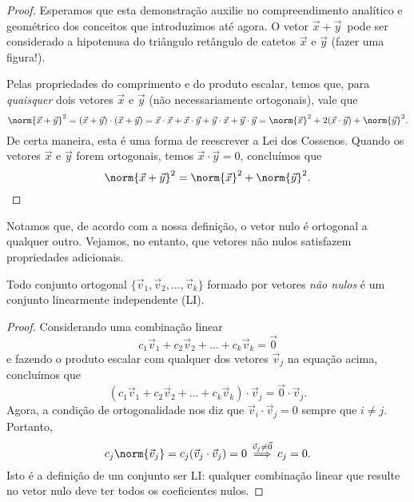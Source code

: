 \begin{proof}
	Esperamos que esta demonstração auxilie no compreendimento analítico e geométrico dos conceitos que introduzimos até agora. O vetor $\vec{x} + \vec{y} \,$ pode ser considerado a hipotenusa do triângulo retângulo de catetos $\vec{x}$ e $\vec{y}$ (fazer uma figura!).

	Pelas propriedades do comprimento e do produto escalar, temos que, para \textit{quaisquer} dois vetores $\vec{x}$ e $\vec{y}$ (não necessariamente ortogonais), vale que
	\begin{equation}
	\norm{\vec{x} + \vec{y}}^2 = (\vec{x} + \vec{y}) \cdot (\vec{x} + \vec{y}) =  \vec{x} \cdot \vec{x} + \vec{x} \cdot \vec{y} +  \vec{y} \cdot \vec{x} +  \vec{y} \cdot \vec{y} = \norm{\vec{x}}^2 + 2 (\vec{x} \cdot \vec{y}) + \norm{\vec{y}}^2.
	\end{equation} De certa maneira, esta é uma forma de reescrever a Lei dos Cossenos. Quando os vetores $\vec{x}$ e $\vec{y}$ forem ortogonais, temos $\vec{x} \cdot \vec{y} = 0$, concluímos que
	\begin{equation}
	\norm{\vec{x} + \vec{y}}^2 = \norm{\vec{x}}^2 + \norm{\vec{y}}^2. \qedhere
	\end{equation}
\end{proof}


Notamos que, de acordo com a nossa definição, o vetor nulo é ortogonal a qualquer outro. Vejamos, no entanto, que vetores não nulos satisfazem propriedades adicionais.

\begin{teo}
	Todo conjunto ortogonal $\{\vec{v}_1, \vec{v}_2, \dots, \vec{v}_k\}$ formado por vetores \textit{não nulos} é um conjunto linearmente independente (LI).
\end{teo}

\begin{proof}
	Considerando uma combinação linear
	\begin{equation}
	c_1 \vec{v}_1 + c_2 \vec{v}_2 + \dots + c_k \vec{v}_k = \vec{0}
	\end{equation} e fazendo o produto escalar com qualquer dos vetores $\vec{v}_j$ na equação acima, concluímos que
	\begin{equation}
	(c_1 \vec{v}_1 + c_2 \vec{v}_2 + \dots + c_k \vec{v}_k ) \cdot \vec{v}_j = \vec{0} \cdot \vec{v}_j.
	\end{equation} Agora, a condição de ortogonalidade nos diz que $\vec{v}_i \cdot \vec{v}_j = 0$ sempre que $i \neq j$. Portanto,
	\begin{equation}
	c_j \norm{\vec{v}_j} = c_j (\vec{v}_j \cdot \vec{v}_j) = 0 \stackrel{\vec{v}_j \neq \vec{0}}{\implies} c_j = 0.
	\end{equation} Isto é a definição de um conjunto ser LI: qualquer combinação linear que resulte no vetor nulo deve ter todos os coeficientes nulos.
\end{proof}

